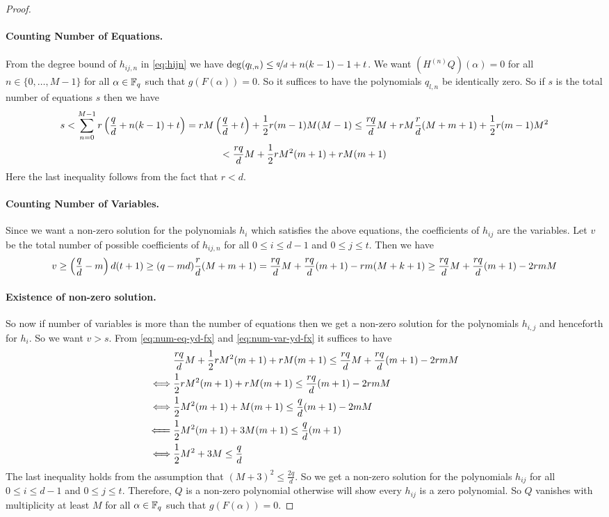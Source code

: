 \begin{proof}
  \paragraph*{Counting Number of Equations.} From the degree bound of $h_{ij,n}$ in \eqref{eq:hijn} we have $\deg(q_{l,n})\leq \nicefrac{q}{d}+n(k-1)-1+t$. We want $(H^{(n)}Q)(\alpha)=0$ for all $n\in\{0,\dots, M-1\}$ for all $\alpha\in\mathbb{F}_q$ such that $g(F(\alpha))=0$. So it suffices to have the polynomials $q_{l,n}$ be identically zero. So if $s$ is the total number of equations $s$ then we have 
  \begin{multline}
    \label{eq:num-eq-yd-fx}
    s<\sum_{n=0}^{M-1}r\left(\frac{q}{d}+n(k-1)+t\right)=rM\left(\frac{q}d+t\right)+\frac12r(m-1)M(M-1)\leq \frac{rq}{d}M+rM\frac{r}{d}(M+m+1)+\frac12r(m-1)M^2\\ 
    <\frac{rq}{d}M+\frac12rM^2(m+1)+rM(m+1)
  \end{multline}
  Here the last inequality follows from the fact that $r<d$.
  \paragraph*{Counting Number of Variables.} Since we want a non-zero solution for the polynomials $h_i$ which satisfies the above equations, the coefficients of $h_{ij}$ are the variables. Let $v$ be the total number of possible coefficients of $h_{ij,n}$ for all $0\leq i\leq d-1$ and $0\leq j\leq t$. Then we have 
  \begin{equation}\label{eq:num-var-yd-fx}
    v\geq \left(\frac{q}d-m\right)d(t+1) \geq (q-md)\frac{r}{d}(M+m+1)=\frac{rq}{d}M+\frac{rq}{d}(m+1)-rm(M+k+1)\geq \frac{rq}{d}M+\frac{rq}{d}(m+1)-2rmM
  \end{equation}
  \paragraph*{Existence of non-zero solution.} So now if number of variables is more than the number of equations then we get a non-zero solution for the polynomials $h_{i,j}$ and henceforth for $h_i$. So we want $v>s$. From \eqref{eq:num-eq-yd-fx} and \eqref{eq:num-var-yd-fx} it suffices to have 
  \begin{align*}
    & \frac{rq}{d}M+\frac12rM^2(m+1)+rM(m+1)\leq \frac{rq}{d}M+\frac{rq}{d}(m+1)-2rmM\\ 
    \iff & \frac12rM^2(m+1)+rM(m+1)\leq\frac{rq}{d}(m+1)-2rmM\\ 
    \iff & \frac12M^2(m+1)+M(m+1)\leq \frac{q}d(m+1)-2mM\\ 
    \xLeftarrow{\hspace{12pt}}\; & \frac12M^2(m+1)+3M(m+1)\leq \frac{q}d(m+1)\\ 
    \iff & \frac12M^2+3M\leq \frac{q}d 
  \end{align*}
  The last inequality holds from the assumption that $(M+3)^2\leq \frac{2q}d$. So we get a non-zero solution for the polynomials $h_{ij}$ for all $0\leq i\leq d-1$ and $0\leq j\leq t$. Therefore, $Q$ is a non-zero polynomial otherwise \StepanovLinIndeplem will show every $h_{ij}$ is a zero polynomial. So $Q$ vanishes with multiplicity at least $M$ for all $\alpha\in\mathbb{F}_q$ such that $g(F(\alpha))=0$. 
  

\end{proof}
